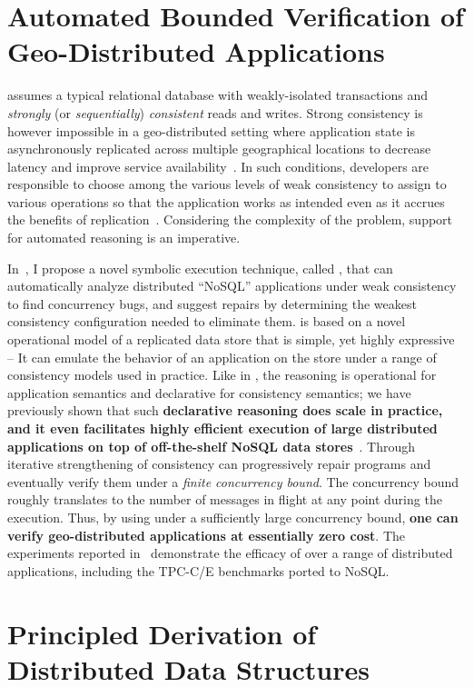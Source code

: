 \section*{Automated Bounded Verification of Geo-Distributed
Applications}

\acidifier assumes a typical relational database with weakly-isolated
transactions and \emph{strongly} (or \emph{sequentially})
\emph{consistent} reads and writes. Strong consistency is however
impossible in a geo-distributed setting where application state is
asynchronously replicated across multiple geographical locations to
decrease latency and improve service availability~\cite{cap2002}. In
such conditions, developers are responsible to choose among the
various levels of weak consistency to assign to various operations so
that the application works as intended even as it accrues the benefits
of replication~\cite{zoo}. Considering the complexity of the problem,
support for automated reasoning is an imperative.

In~\cite{oopsla18}, I propose a novel symbolic execution technique,
called \qnine, that can automatically analyze distributed ``NoSQL''
applications under weak consistency to find concurrency bugs, and
suggest repairs by determining the weakest consistency configuration
needed to eliminate them. \qnine is based on a novel operational model
of a replicated data store that is simple, yet highly expressive -- It
can emulate the behavior of an application on the store under a range
of consistency models used in practice. Like in \acidifier, the
reasoning is operational for application semantics and declarative for
consistency semantics; we have previously shown that such
\textbf{declarative reasoning does scale in practice, and it even
facilitates highly efficient execution of large distributed
applications on top of off-the-shelf NoSQL data stores}~\cite{pldi15}.
Through iterative strengthening of consistency \qnine can
progressively repair programs and eventually verify them under a
\emph{finite concurrency bound}. The concurrency bound roughly
translates to the number of messages in flight at any point during the
execution. Thus, by using \qnine under a sufficiently large concurrency
bound, \textbf{one can verify geo-distributed applications at
essentially zero cost}. The experiments reported in~\cite{oopsla18}
demonstrate the efficacy of \qnine over a range of distributed
applications, including the TPC-C/E benchmarks ported to NoSQL. 

\section*{Principled Derivation of Distributed Data Structures}

